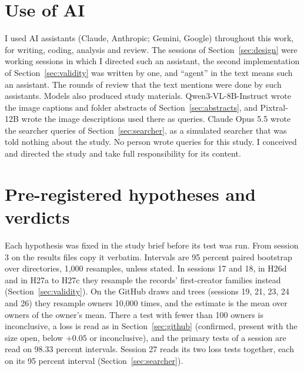 \documentclass[11pt]{article}
\begin{document}
\section*{Use of AI}

I used AI assistants (Claude, Anthropic; Gemini, Google) throughout this work, for writing, coding, analysis and review. The sessions of Section~\ref{sec:design} were working sessions in which I directed such an assistant, the second implementation of Section~\ref{sec:validity} was written by one, and ``agent'' in the text means such an assistant. The rounds of review that the text mentions were done by such assistants. Models also produced study materials. Qwen3-VL-8B-Instruct wrote the image captions and folder abstracts of Section~\ref{sec:abstracts}, and Pixtral-12B wrote the image descriptions used there as queries. Claude Opus 5.5 wrote the searcher queries of Section~\ref{sec:searcher}, as a simulated searcher that was told nothing about the study. No person wrote queries for this study. I conceived and directed the study and take full responsibility for its content.




\appendix
\section{Pre-registered hypotheses and verdicts}
\label{app:hyp}

Each hypothesis was fixed in the study brief before its test was run. From session 3 on the results files copy it verbatim. Intervals are 95 percent paired bootstrap over directories, 1,000 resamples, unless stated. In sessions 17 and 18, in H26d and in H27a to H27c they resample the records' first-creator families instead (Section~\ref{sec:validity}). On the GitHub draws and trees (sessions 19, 21, 23, 24 and 26) they resample owners 10,000 times, and the estimate is the mean over owners of the owner's mean. There a test with fewer than 100 owners is inconclusive, a loss is read as in Section~\ref{sec:github} (confirmed, present with the size open, below $+0.05$ or inconclusive), and the primary tests of a session are read on 98.33 percent intervals. Session 27 reads its two loss tests together, each on its 95 percent interval (Section~\ref{sec:searcher}).
\end{document}
